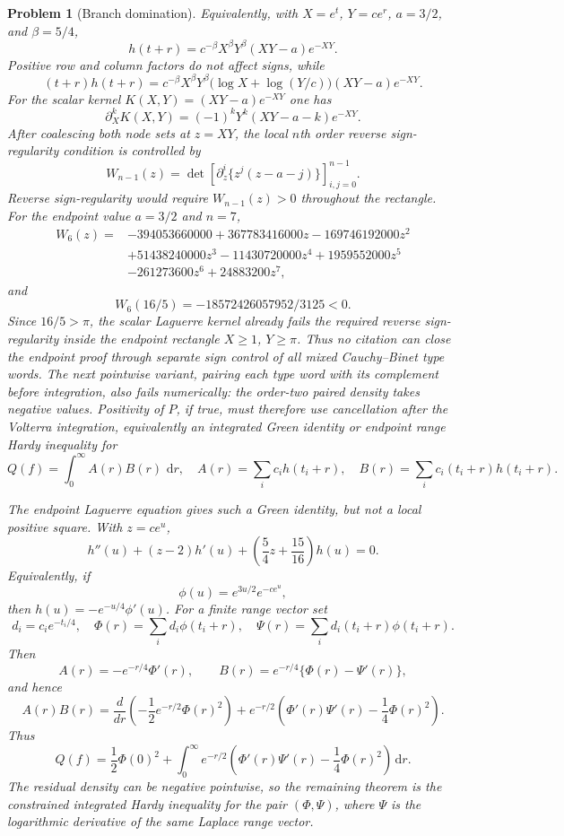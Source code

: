 \documentclass[11pt]{article}
\newtheorem{problem}[theorem]{Problem}
\newcommand{\dd}{\,\mathrm d}
\begin{document}
\begin{problem}[Branch domination]
Equivalently, with $X=e^t$, $Y=ce^r$, $a=3/2$, and $\beta=5/4$,
\[
  h(t+r)=c^{-\beta}X^\beta Y^\beta (XY-a)e^{-XY}.
\]
Positive row and column factors do not affect signs, while
\[
  (t+r)h(t+r)
  =
  c^{-\beta}X^\beta Y^\beta
  \bigl(\log X+\log(Y/c)\bigr)(XY-a)e^{-XY}.
\]
For the scalar kernel $K(X,Y)=(XY-a)e^{-XY}$ one has
\[
  \partial_X^k K(X,Y)=(-1)^kY^k(XY-a-k)e^{-XY}.
\]
After coalescing both node sets at $z=XY$, the local $n$th order reverse
sign-regularity condition is controlled by
\[
  W_{n-1}(z)=
  \det\left[\partial_z^i\{z^j(z-a-j)\}\right]_{i,j=0}^{n-1}.
\]
Reverse sign-regularity would require $W_{n-1}(z)>0$ throughout the rectangle.
For the endpoint value $a=3/2$ and $n=7$,
\[
\begin{aligned}
W_6(z)=&-394053660000+367783416000z-169746192000z^2\\
&+51438240000z^3-11430720000z^4+1959552000z^5\\
&-261273600z^6+24883200z^7,
\end{aligned}
\]
and
\[
  W_6(16/5)=-18572426057952/3125<0 .
\]
Since $16/5>\pi$, the scalar Laguerre kernel already fails the required
reverse sign-regularity inside the endpoint rectangle $X\ge1$, $Y\ge\pi$.
Thus no citation can close the endpoint proof through separate sign control of
all mixed Cauchy--Binet type words.  The next pointwise variant, pairing each
type word with its complement before integration, also fails numerically: the
order-two paired density takes negative values.  Positivity of $P$, if true,
must therefore use cancellation after the Volterra integration, equivalently an
integrated Green identity or endpoint range Hardy inequality for
\[
  Q(f)=\int_0^\infty A(r)B(r)\,\dd r,\quad
  A(r)=\sum_i c_i h(t_i+r),\quad
  B(r)=\sum_i c_i(t_i+r)h(t_i+r).
\]

The endpoint Laguerre equation gives such a Green identity, but not a local
positive square.  With $z=ce^u$,
\[
  h''(u)+(z-2)h'(u)+\left(\frac54 z+\frac{15}{16}\right)h(u)=0.
\]
Equivalently, if
\[
  \phi(u)=e^{3u/2}e^{-ce^u},
\]
then $h(u)=-e^{-u/4}\phi'(u)$.  For a finite range vector set
\[
  d_i=c_i e^{-t_i/4},\quad
  \Phi(r)=\sum_i d_i\phi(t_i+r),\quad
  \Psi(r)=\sum_i d_i(t_i+r)\phi(t_i+r).
\]
Then
\[
  A(r)=-e^{-r/4}\Phi'(r),\qquad
  B(r)=e^{-r/4}\{\Phi(r)-\Psi'(r)\},
\]
and hence
\[
  A(r)B(r)
  =
  \frac{d}{dr}\left(-\frac12e^{-r/2}\Phi(r)^2\right)
  +e^{-r/2}\left(\Phi'(r)\Psi'(r)-\frac14\Phi(r)^2\right).
\]
Thus
\[
  Q(f)=\frac12\Phi(0)^2+
  \int_0^\infty e^{-r/2}
  \left(\Phi'(r)\Psi'(r)-\frac14\Phi(r)^2\right)\dd r .
\]
The residual density can be negative pointwise, so the remaining theorem is the
constrained integrated Hardy inequality for the pair $(\Phi,\Psi)$, where
$\Psi$ is the logarithmic derivative of the same Laplace range vector.


\end{problem}
\end{document}
